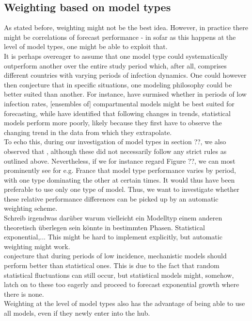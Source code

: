 \subsection{Weighting based on model types}
As stated before, weighting might not be the best idea. However, in practice there might be correlations of forecast performance - in sofar as this happens at the level of model types, one might be able to exploit that.\\
It is perhaps overeager to assume that one model type could systematically outperform another over the entire study period which, after all, comprises different countries with varying periods of infection dynamics. One could however then conjecture that in specific situations, one modeling philosophy could be better suited than another. For instance, \cite{taylor_combining_2021} have surmised whether in periods of low infection rates, [ensembles of] compartmental models might be best suited for forecasting, while \citep{bracher_pre-registered_2021} have identified that following changes in trends, statistical models perform more poorly, likely because they first have to observe the changing trend in the data from which they extrapolate.\\
To echo this, during our investigation of model types in section ??, we also observed that , although these did not necessarily follow any strict rules as outlined above. Nevertheless, if we for instance regard Figure ??, we can most prominently see for e.g. France that model type performance varies by period, with one type dominating the other at certain times. It would thus have been preferable to use only one type of model. Thus, we want to investigate whether these relative performance differences can be picked up by an automatic weighting scheme. \\
Schreib irgendwas darüber warum vielleicht ein Modelltyp einem anderen theoretisch überlegen sein könnte in bestimmten Phasen. Statistical exponential,... This might be hard to implement explicitly, but automatic weighting might work.\\
\cite{taylor_combining_2021} conjecture that during periods of low incidence, mechanistic models should perform better than statistical ones. This is due to the fact that random statistical fluctuations can still occur, but statistical models might, somehow, latch on to these too eagerly and proceed to forecast exponential growth where there is none.\\
Weighting at the level of model types also has the advantage of being able to use all models, even if they newly enter into the hub.\\
